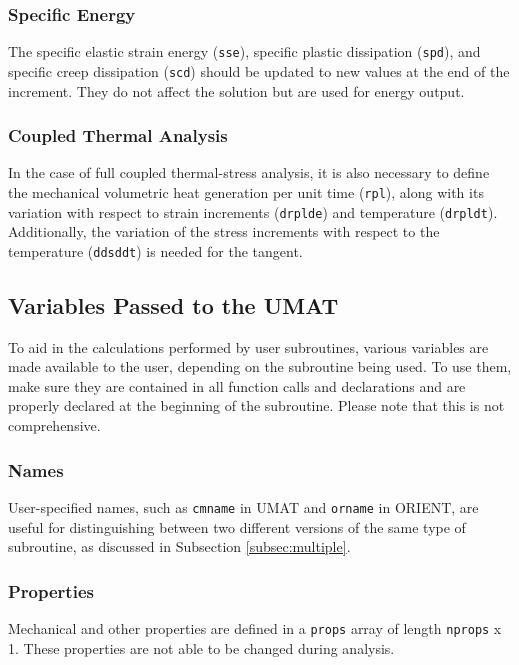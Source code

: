 \documentclass[10pt,letterpaper,oneside]{report}
\begin{document}
\subsubsection{Specific Energy}
The specific elastic strain energy (\texttt{sse}), specific plastic dissipation (\texttt{spd}), and specific creep dissipation (\texttt{scd}) should be updated to new values at the end of the increment.  They do not affect the solution but are used for energy output.  

\subsubsection{Coupled Thermal Analysis}
In the case of full coupled thermal-stress analysis, it is also necessary to define the mechanical volumetric heat generation per unit time (\texttt{rpl}), along with its variation with respect to strain increments (\texttt{drplde}) and temperature (\texttt{drpldt}).  Additionally, the variation of the stress increments with respect to the temperature (\texttt{ddsddt}) is needed for the tangent.  


\subsection{Variables Passed to the UMAT}
To aid in the calculations performed by user subroutines, various variables are made available to the user, depending on the subroutine being used.  To use them, make sure they are contained in all function calls and declarations and are properly declared at the beginning of the subroutine.  Please note that this is not comprehensive.  

\subsubsection{Names}
User-specified names, such as \texttt{cmname} in UMAT and \texttt{orname} in ORIENT, are useful for distinguishing between two different versions of the same type of subroutine, as discussed in Subsection \ref{subsec:multiple}.  

\subsubsection{Properties}
Mechanical and other properties are defined in a \texttt{props} array of length \texttt{nprops} x 1.  These properties are not able to be changed during analysis.
\end{document}
